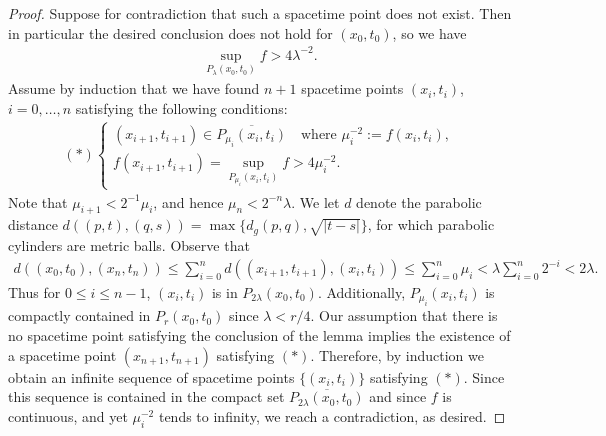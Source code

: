 \documentclass[10pt,a4paper]{amsart}
\begin{document}
\begin{proof}
    Suppose for %
    contradiction that such a spacetime point does not exist. Then in particular the desired conclusion does not hold for \((x_0, t_0)\), so we have
    \begin{align*}
        \sup_{P_\lambda(x_0, t_0)} f > 4\lambda^{-2}.
    \end{align*} Assume by induction that we have found \(n+1\) spacetime points \((x_i, t_i)\), \(i = 0, \ldots, n\) satisfying
    the following conditions:
    \begin{align*}
       (\ast) \begin{cases}
            (x_{i+1}, t_{i+1}) \in \overline{P_{\mu_i}(x_i, t_i)} \ \ \ \text{ where } \mu_i^{-2} := f(x_i, t_i), \\
            f(x_{i + 1}, t_{i+1}) = \sup_{P_{\mu_i}(x_i, t_i)} f > 4\mu_i^{-2}.
        \end{cases}
    \end{align*} Note that \(\mu_{i+1} < 2^{-1}\mu_i\), and hence \(\mu_n < 2^{-n}\lambda\). We let \(d\) denote the parabolic distance \(d((p, t), (q, s)) = \max\{d_g(p, q), \sqrt{|t-s|}\}\), for which parabolic cylinders are metric balls. Observe that 
    \begin{align*}
        d((x_0, t_0), (x_n, t_n)) \leq \sum_{i = 0}^n d((x_{i+1}, t_{i+1}), (x_i, t_i)) \leq \sum_{i = 0}^n \mu_i < \lambda \sum_{i = 0}^n 2^{-i} < 2\lambda.
    \end{align*} Thus for \(0 \leq i \leq n-1\), \((x_i, t_i)\) is in \(P_{2\lambda}(x_0, t_0)\). Additionally, \(P_{\mu_i}(x_i, t_i)\) is compactly contained in \(P_r(x_0, t_0)\) since \(\lambda < r/4\). Our assumption that there is no spacetime point satisfying the conclusion of the lemma implies the existence of a spacetime point \((x_{n+1}, t_{n+1})\) satisfying \((\ast)\). Therefore, by induction we obtain an infinite sequence of spacetime points \(\{(x_i, t_i)\}\) satisfying \((\ast)\). Since this sequence is contained in the compact set \(\overline{P_{2\lambda}(x_0, t_0)}\) and since \(f\) is continuous, and yet \(\mu_i^{-2}\) tends to infinity, we reach a contradiction, as desired.
\end{proof}
\end{document}
